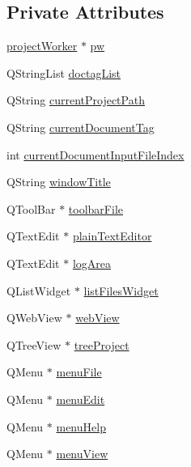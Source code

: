 \subsection*{Private Attributes}
\begin{DoxyCompactItemize}
\item 
\hyperlink{classproject_worker}{project\+Worker} $\ast$ \hyperlink{classcdc_main_window_a2ab9ee82b6b3a303bfecaa9f477f8595}{pw}
\item 
Q\+String\+List \hyperlink{classcdc_main_window_aca67c5aa9dee926f1ea9190b23709d7d}{doctag\+List}
\item 
Q\+String \hyperlink{classcdc_main_window_a2a636f427e14608215f1115de3369ded}{current\+Project\+Path}
\item 
Q\+String \hyperlink{classcdc_main_window_aa819ac3dd6acd06ae65d136a4f683e97}{current\+Document\+Tag}
\item 
int \hyperlink{classcdc_main_window_aca3064de74e5cf938c009d5ab8f2e805}{current\+Document\+Input\+File\+Index}
\item 
Q\+String \hyperlink{classcdc_main_window_a1ca58eeaa25a25ef5f1dbc6772d0853a}{window\+Title}
\item 
Q\+Tool\+Bar $\ast$ \hyperlink{classcdc_main_window_a5d1a9fb552d49501601e0f815e1205f0}{toolbar\+File}
\item 
Q\+Text\+Edit $\ast$ \hyperlink{classcdc_main_window_ad2f451768cf6b6d2d2e828a0598a7b67}{plain\+Text\+Editor}
\item 
Q\+Text\+Edit $\ast$ \hyperlink{classcdc_main_window_acf5379568430403fc8080d3e2fdc22f4}{log\+Area}
\item 
Q\+List\+Widget $\ast$ \hyperlink{classcdc_main_window_a5e658d4cb5bc593d10e30b9fbf680c84}{list\+Files\+Widget}
\item 
Q\+Web\+View $\ast$ \hyperlink{classcdc_main_window_a9b0360abdaa43b49ba788baf4dab83fa}{web\+View}
\item 
Q\+Tree\+View $\ast$ \hyperlink{classcdc_main_window_a5adfe51057f2e53feddc1367cf50609e}{tree\+Project}
\item 
Q\+Menu $\ast$ \hyperlink{classcdc_main_window_a10261cfc57f6d2f7dc8d69c449ded903}{menu\+File}
\item 
Q\+Menu $\ast$ \hyperlink{classcdc_main_window_a0d41f03c46c693ee6a4d82b807aaca6b}{menu\+Edit}
\item 
Q\+Menu $\ast$ \hyperlink{classcdc_main_window_a8ad1d65233c7c537387d633e73693fb2}{menu\+Help}
\item 
Q\+Menu $\ast$ \hyperlink{classcdc_main_window_aff43f7f9a42d9aaa9f468acc48399cc2}{menu\+View}

\end{DoxyCompactItemize}

